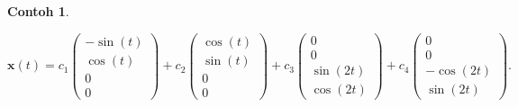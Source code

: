 \documentclass[a4paper]{article}
\theoremstyle{definisi}
\newtheorem{contoh}{Contoh}[section]
\numberwithin{equation}{section}
\begin{document}
\begin{contoh}
\begin{enumerate}[label=Langkah \arabic*: ,leftmargin=*]
      \[\mathbf{x}(t) = c_1\begin{pmatrix}-\sin(t)\\ \cos(t)\\0\\0\end{pmatrix} + c_2\begin{pmatrix}\cos(t)\\ \sin(t)\\0\\0\end{pmatrix} + c_3\begin{pmatrix}0\\0\\\sin(2t)\\ \cos(2t)\end{pmatrix} + c_4\begin{pmatrix}0\\0\\ -\cos(2t)\\ \sin(2t)\end{pmatrix}.\]
    \end{enumerate}
  \end{contoh}
\end{document}
